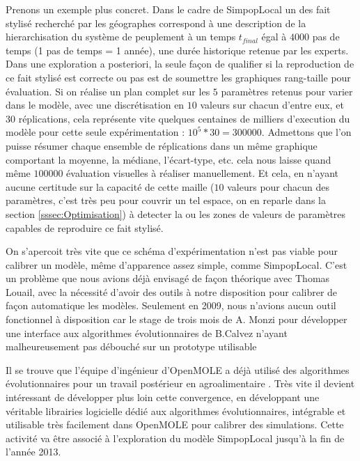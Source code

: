 Prenons un exemple plus concret. Dans le cadre de SimpopLocal \autocites{Schmitt2015,Schmitt2014} un des fait stylisé recherché par les géographes correspond à une description de la hierarchisation du système de peuplement à un temps $t_{final}$ égal à $4000$ pas de temps (1 pas de temps = 1 année), une durée historique retenue par les experts. Dans une exploration a posteriori, la seule façon de qualifier si la reproduction de ce fait stylisé est correcte ou pas est de soumettre les graphiques rang-taille pour évaluation. Si on réalise un plan complet sur les $5$ paramètres retenus pour varier dans le modèle, avec une discrétisation en $10$ valeurs sur chacun d'entre eux, et $30$ réplications, cela représente vite quelques centaines de milliers d'execution du modèle pour cette seule expérimentation : $10^{5} * 30 = \num{300000}$. Admettons que l'on puisse résumer chaque ensemble de réplications dans un même graphique comportant la moyenne, la médiane, l'écart-type, etc. cela nous laisse quand même $\num{100000}$ évaluation visuelles à réaliser manuellement. Et cela, en n'ayant aucune certitude sur la capacité de cette maille ($10$ valeurs pour chacun des paramètres, c'est très peu pour couvrir un tel espace, on en reparle dans la section \ref{sssec:Optimisation}) à detecter la ou les zones de valeurs de paramètres capables de reproduire ce fait stylisé.

On s'apercoit très vite que ce schéma d'expérimentation n'est pas viable pour calibrer un modèle, même d'apparence assez simple, comme SimpopLocal. C'est un problème que nous avions déjà envisagé de façon théorique avec Thomas Louail, avec la nécessité d'avoir des outils à notre disposition pour calibrer de façon automatique les modèles. Seulement en 2009, nous n'avions aucun outil fonctionnel à disposition car le stage de trois mois de A. Monzi pour développer une interface aux algorithmes évolutionnaires de B.Calvez n'ayant malheureusement pas débouché sur un prototype utilisable \autocite[140-141]{Louail2010}

Il se trouve que l'équipe d'ingénieur d'OpenMOLE a déjà utilisé des algorithmes évolutionnaires pour un travail postérieur en agroalimentaire \autocite{Mesmoudi2010}. Très vite il devient intéressant de développer plus loin cette convergence, en développant une véritable librairies logicielle dédié aux algorithmes évolutionnaires, intégrable et utilisable très facilement dans OpenMOLE pour calibrer des simulations. Cette activité va être associé à l'exploration du modèle SimpopLocal jusqu'à la fin de l'année 2013.

